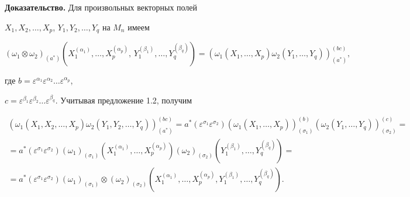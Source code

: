  


{\bf Доказательство.} Для произвольных векторных полей 


$X_1,X_2,\dotsc,X_p$, $Y_1,Y_2,\dotsc,Y_q$ на $M_n$ имеем 


$$ 


(\omega_1\otimes\omega_2)_{(a^*)} 


(X^{(\alpha_1)}_1,\dotsc,X^{(\alpha_p)}_p,\, 


Y^{(\beta_1)}_1,\dotsc,Y^{(\beta_q)}_q)= 


(\omega_1(X_1,\dotsc,X_p)\omega_2(Y_1,\dotsc,Y_q) 


)^{(b c)}_{(a^*)}, 


$$ 


где $b=\varepsilon^{\alpha_1}\varepsilon^{\alpha_2}\dotsc 


\varepsilon^{\alpha_p}$, 


$c=\varepsilon^{\beta_1}\varepsilon^{\beta_2}\dotsc 


\varepsilon^{\beta_q}$. Учитывая предложение 1.2, получим 


\begin{multline*} 


(\omega_1(X_1,X_2,\dotsc,X_p) 


\omega_2(Y_1,Y_2,\dotsc,Y_q))^{(b c)}_{(a^*)}= 


a^*(\varepsilon^{\sigma_1}\varepsilon^{\sigma_2}) 


(\omega_1(X_1,\dotsc,X_p))^{(b)}_{(\sigma_1)} 


(\omega_2(Y_1,\dotsc,Y_q))^{(c)}_{(\sigma_2)}= \\ 


% 


=a^*(\varepsilon^{\sigma_1}\varepsilon^{\sigma_2}) 


(\omega_1)_{(\sigma_1)} 


(X^{(\alpha_1)}_1,\dotsc,X^{(\alpha_p)}_p) 


(\omega_2)_{(\sigma_2)} 


(Y^{(\beta_1)}_1,\dotsc,Y^{(\beta_q)}_q)= \\ 


% 


=a^*(\varepsilon^{\sigma_1}\varepsilon^{\sigma_2}) 


(\omega_1)_{(\sigma_1)}\otimes(\omega_2)_{(\sigma_2)} 


(X^{(\alpha_1)}_1,\dotsc,X^{(\alpha_p)}_p, 


Y^{(\beta_1)}_1,\dotsc,Y^{(\beta_q)}_q). 


\end{multline*} 


